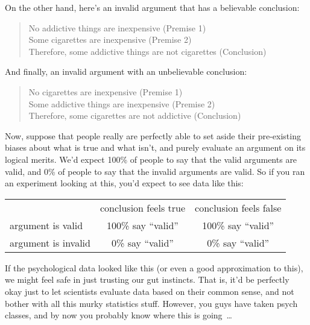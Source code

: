 On the other hand, here's an invalid argument that has a believable conclusion:
\begin{quote}
No addictive things are inexpensive (Premise 1)\\
Some cigarettes are inexpensive (Premise 2)\\
Therefore, some addictive things are not cigarettes (Conclusion)
\end{quote}
And finally, an invalid argument with an unbelievable conclusion:
\begin{quote}
No cigarettes are inexpensive (Premise 1)\\
Some addictive things are inexpensive (Premise 2)\\
Therefore, some cigarettes are not addictive (Conclusion)
\end{quote}
Now, suppose that people really are perfectly able to set aside their pre-existing biases about what is true and what isn't, and purely evaluate an argument on its logical merits. We'd expect 100\% of people to say that the valid arguments are valid, and 0\% of people to say that the invalid arguments are valid. So if you ran an experiment looking at this, you'd expect to see data like this:

\begin{center}
\renewcommand{\arraystretch}{1.5}
\begin{tabular}{l|cc|}
\multicolumn{1}{c}{} & \multicolumn{1}{c}{conclusion feels true} & \multicolumn{1}{c}{conclusion feels false} \\ \cline{2-3}
argument is valid   & 100\% say ``valid'' & 100\%  say ``valid''\\ 
argument is invalid &  0\% say ``valid''& 0\% say ``valid''\\ \cline{2-3}
\end{tabular}
\end{center}

\noindent
If the psychological data looked like this (or even a good approximation to this), we might feel safe in just trusting our gut instincts. That is, it'd be perfectly okay just to let scientists evaluate data based on their common sense, and not bother with all this murky statistics stuff. However, you guys have taken psych classes, and by now you probably know where this is going~\ldots

